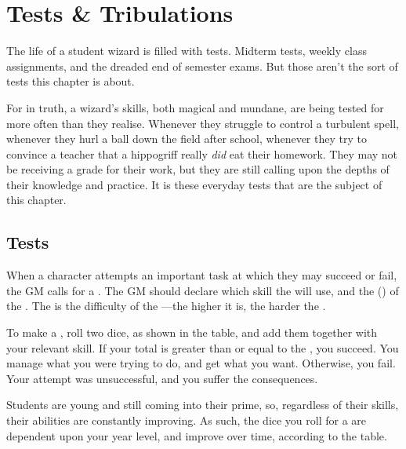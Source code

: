 \chapter{Tests \& Tribulations}


The life of a student wizard is filled with tests.
Midterm tests, weekly class assignments, and the dreaded end of semester exams.
But those aren't the sort of tests this chapter is about.

For in truth, a wizard's skills, both magical and mundane, are being tested for more often than they realise.
Whenever they struggle to control a turbulent spell,
whenever they hurl a ball down the field after school,
whenever they try to convince a teacher that a hippogriff really \emph{did} eat their homework.
They may not be receiving a grade for their work, but they are still calling upon the depths of their knowledge and practice.
It is these everyday tests that are the subject of this chapter.

\section{Tests}

When a character attempts an important task at which they may succeed or fail, the GM calls for a {\test}.
The GM should declare which skill the {\test} will use, and the {\targetnumber} ({\tn}) of the {\test}.
The {\targetnumber} is the difficulty of the {\test}---the higher it is, the harder the {\test}.

To make a {\test}, roll two dice, as shown in the  table, and add them together with your relevant skill.
If your total is greater than or equal to the {\tn}, you succeed.
You manage what you were trying to do, and get what you want.
Otherwise, you fail.
Your attempt was unsuccessful, and you suffer the consequences.

Students are young and still coming into their prime, so, regardless of their skills, their abilities are constantly improving.
As such, the dice you roll for a {\test} are dependent upon your year level, and improve over time, according to the  table.



